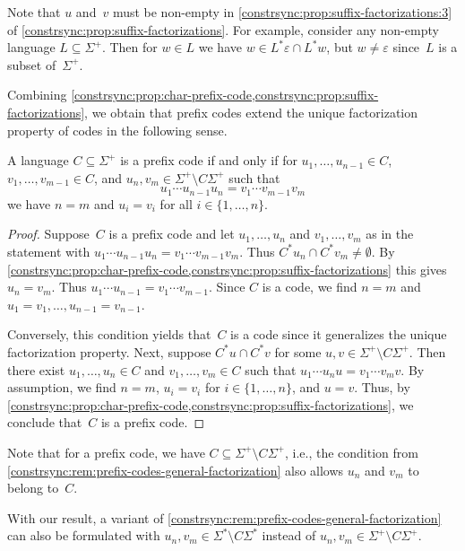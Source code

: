 Note that $u$ and~$v$ must be non-empty in \cref{constrsync:prop:suffix-factorizations:3} of
\cref{constrsync:prop:suffix-factorizations}.
For example, consider any non-empty language $L \subseteq \Sigma^+$.
Then for $w \in L$ we have $w \in L^*\varepsilon \cap L^*w$,
but $w \ne \varepsilon$ since~$L$ is a subset of~$\Sigma^+$.

Combining \cref{constrsync:prop:char-prefix-code,constrsync:prop:suffix-factorizations},
we obtain that prefix codes extend the unique factorization property of codes
in the following sense.

\begin{corollary}  \label{constrsync:rem:prefix-codes-general-factorization}
	 \label{contrsync:prop:prefix-code-suffix-unique}
	A language $C \subseteq \Sigma^+$ is a prefix code if and only if
	for $u_1, \ldots, u_{n-1} \in C$, $v_1, \ldots, v_{m-1} \in C$,
	and $u_n, v_m \in \Sigma^+ \setminus C\Sigma^+$
	such that
	\[
	u_1 \cdots u_{n-1} u_n = v_1 \cdots v_{m-1} v_m
	\]
	we have $n = m$ and $u_i = v_i$ for all $i \in \{1,\ldots,n\}$.
\end{corollary}
\begin{proof}
	Suppose~$C$ is a prefix code and let $u_1, \ldots, u_n$
	and $v_1, \ldots, v_m$ as in the statement
	with $u_1 \cdots u_{n-1} u_n = v_1 \cdots v_{m-1} v_m$.
	Thus $C^* u_n \cap C^* v_m \ne \emptyset$.
	By \cref{constrsync:prop:char-prefix-code,constrsync:prop:suffix-factorizations}
	this gives $u_n = v_m$.
	Thus $u_1 \cdots u_{n-1} = v_1 \cdots v_{m-1}$.
	Since $C$ is a code, we find $n = m$ and $u_1 = v_1, \ldots, u_{n-1} = v_{n-1}$.	
	
	Conversely, this condition yields that~$C$ is a code
	since it generalizes the unique factorization property.
	Next, suppose $C^* u \cap C^* v$ for some $u,v \in \Sigma^+ \setminus C\Sigma^+$.
	Then there exist $u_1, \ldots, u_n \in C$
	and $v_1, \ldots, v_m \in C$
	such that $u_1 \cdots u_n u = v_1 \cdots v_m v$.
	By assumption, we find $n = m$, $u_i = v_i$ for $i \in \{1,\ldots,n\}$,
	and $u = v$.
	Thus, by \cref{constrsync:prop:char-prefix-code,constrsync:prop:suffix-factorizations},
	we conclude that~$C$ is a prefix code.
\end{proof}

Note that for a prefix code, we have
$C \subseteq \Sigma^+ \setminus C\Sigma^+$, i.e., the condition from
\cref{constrsync:rem:prefix-codes-general-factorization}
also allows $u_n$ and $v_m$ to belong to~$C$.

With our result, a variant of
\cref{constrsync:rem:prefix-codes-general-factorization}
can also be formulated with
$u_n, v_m \in \Sigma^* \setminus C\Sigma^*$
instead of
$u_n, v_m \in \Sigma^+ \setminus C\Sigma^+$.

